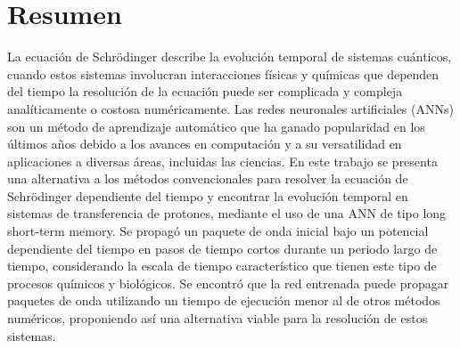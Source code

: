 \begingroup
\let\clearpage\relax
\let\cleardoublepage\relax
\let\cleardoublepage\relax

\chapter*{Resumen}
\small
La ecuación de Schrödinger describe la evolución temporal de sistemas cuánticos, cuando estos sistemas involucran interacciones físicas y químicas que dependen del tiempo la resolución de la ecuación puede ser complicada y compleja analíticamente o costosa numéricamente. Las redes neuronales artificiales (\acs{ANN}s) son un método de aprendizaje automático que ha ganado popularidad en los últimos años debido a los avances en computación y a su versatilidad en aplicaciones a diversas áreas, incluidas las ciencias. En este trabajo se presenta una alternativa a los métodos convencionales para resolver la ecuación de Schrödinger dependiente del tiempo y encontrar la evolución temporal en sistemas de transferencia de protones, mediante el uso de una \acs{ANN} de tipo long short-term memory. Se propagó un paquete de onda inicial bajo un potencial dependiente del tiempo en pasos de tiempo cortos durante un periodo largo de tiempo, considerando la escala de tiempo característico que tienen este tipo de procesos químicos y biológicos. Se encontró que la red entrenada puede propagar paquetes de onda utilizando un tiempo de ejecución menor al de otros métodos numéricos, proponiendo así una alternativa viable para la resolución de estos sistemas.

